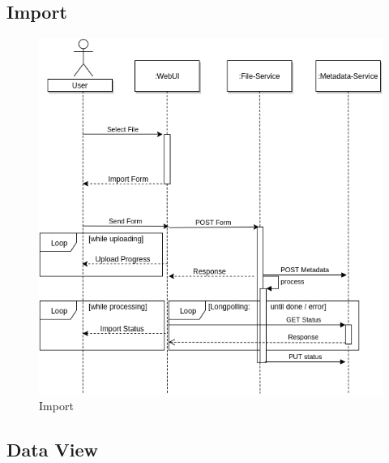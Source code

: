 \subsection{Import}
\begin{figure}[H]
	\centering\includegraphics[width=.75\textwidth]{res/Import}
	\caption{Import}
	\label{fig:import}
\end{figure}



\subsection{Data View}



